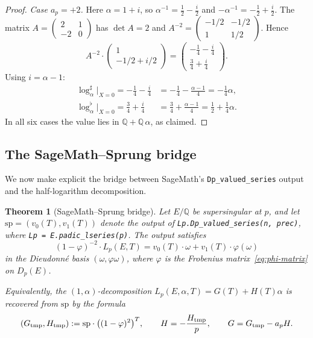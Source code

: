 \documentclass[11pt,a4paper]{amsart}
\newtheorem{theorem}{Theorem}[section]
\theoremstyle{definition}
\newcommand{\Q}{\mathbb{Q}}
\begin{document}
\begin{proof}
\smallskip
\noindent\emph{Case $a_p = +2$.} Here $\alpha = 1 + i$, so $\alpha^{-1} = \tfrac{1}{2} - \tfrac{i}{2}$ and $-\alpha^{-1} = -\tfrac{1}{2} + \tfrac{i}{2}$. The matrix $A = \begin{pmatrix} 2 & 1 \\ -2 & 0 \end{pmatrix}$ has $\det A = 2$ and
$A^{-2} = \begin{pmatrix} -1/2 & -1/2 \\ 1 & 1/2 \end{pmatrix}$. Hence
\[
A^{-2} \cdot \begin{pmatrix} 1 \\ -1/2 + i/2 \end{pmatrix}
= \begin{pmatrix} -\tfrac{1}{4} - \tfrac{i}{4} \\ \tfrac{3}{4} + \tfrac{i}{4} \end{pmatrix}.
\]
Using $i = \alpha - 1$:
\begin{align*}
\log_\alpha^\sharp|_{X=0} = -\tfrac{1}{4} - \tfrac{i}{4} &= -\tfrac{1}{4} - \tfrac{\alpha - 1}{4} = -\tfrac{1}{4}\alpha, \\
\log_\alpha^\flat|_{X=0} = \tfrac{3}{4} + \tfrac{i}{4} &= \tfrac{3}{4} + \tfrac{\alpha - 1}{4} = \tfrac{1}{2} + \tfrac{1}{4}\alpha.
\end{align*}
In all six cases the value lies in $\Q + \Q\,\alpha$, as claimed.
\end{proof}

\subsection{The SageMath--Sprung bridge}\label{ssec:bridge}

We now make explicit the bridge between SageMath's \texttt{Dp\_valued\_series} output and the half-logarithm decomposition.

\begin{theorem}[SageMath--Sprung bridge]\label{thm:bridge}
Let $E/\Q$ be supersingular at $p$, and let $\mathrm{sp} = (v_0(T), v_1(T))$ denote the output of \texttt{Lp.Dp\_valued\_series(n, prec)}, where \texttt{Lp = E.padic\_lseries(p)}. The output satisfies
\begin{equation}\label{eq:sage-def}
(1 - \varphi)^{-2} \cdot L_p(E, T) = v_0(T) \cdot \omega + v_1(T) \cdot \varphi(\omega)
\end{equation}
in the Dieudonn\'e basis $(\omega, \varphi\omega)$, where $\varphi$ is the Frobenius matrix~\eqref{eq:phi-matrix} on $D_p(E)$.

Equivalently, the $(1, \alpha)$-decomposition $L_p(E, \alpha, T) = G(T) + H(T)\alpha$ is recovered from $\mathrm{sp}$ by the formula
\begin{equation}\label{eq:bridge-explicit}
(G_{\rm tmp}, H_{\rm tmp}) := \mathrm{sp} \cdot \bigl((1-\varphi)^2\bigr)^T, \qquad H = -\frac{H_{\rm tmp}}{p}, \qquad G = G_{\rm tmp} - a_p H.
\end{equation}
\end{theorem}
\end{document}
